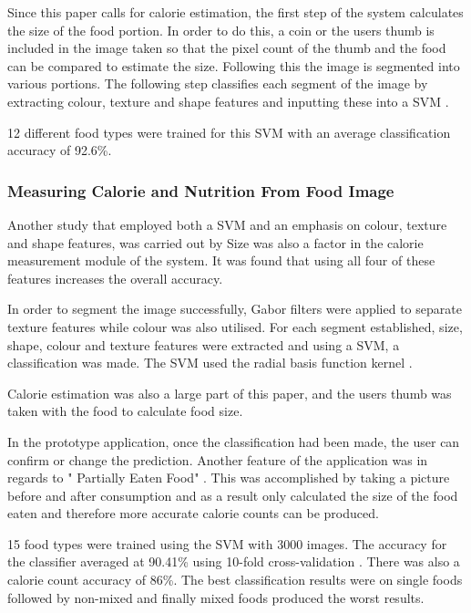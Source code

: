 Since this paper calls for calorie estimation, the first step of the system calculates the size of the food portion. In order to do this, a coin or the users thumb is included in the image taken so that the pixel count of the thumb and the food can be compared to estimate the size. Following this the image is segmented into various portions. The following step classifies each segment of the image by extracting colour, texture and shape features and inputting these into a SVM \parencite{novelSVM}.

12 different food types were trained for this SVM with an average classification accuracy of 92.6\%.

\subsubsection*{Measuring Calorie and Nutrition From Food Image}
Another study that employed both a SVM and an emphasis on colour, texture and shape features, was carried out by \parencite{pouladzadeh2014measuring}
 Size was also a factor in the calorie measurement module of the system. It was found that using all four of these features increases the overall accuracy.

In order to segment the image successfully, Gabor filters were applied to separate texture features while colour was also utilised. For each segment established, size, shape, colour and texture features were extracted and using a SVM, a classification was made. The SVM used the radial basis function kernel \parencite{pouladzadeh2014measuring}.

Calorie estimation was also a large part of this paper, and the users thumb was taken with the food to calculate food size.

In the prototype application, once the classification had been made, the user can confirm or change the prediction. Another feature of the application was in regards to " Partially Eaten Food" \parencite{pouladzadeh2014measuring}. This was accomplished by taking a picture before and after consumption and as a result only calculated the size of the food eaten and therefore more accurate calorie counts can be produced.

15 food types were trained using the SVM with 3000 images. The accuracy for the classifier averaged at 90.41\% using 10-fold cross-validation \parencite{pouladzadeh2014measuring}. There was also a calorie count accuracy of 86\%. The best classification results were on single foods followed by non-mixed and finally mixed foods produced the worst results.


